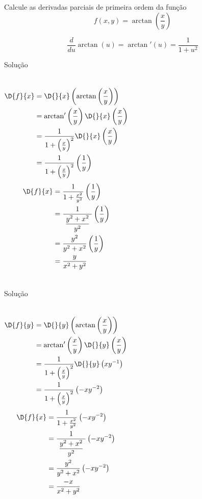 \begin{question}
  Calcule as derivadas parciais de primeira ordem da função
  \[
    f(x,y) = \arctan\left(\frac{x}{y}\right)
  \]

  \pause
  \[
    \frac{d}{du} \arctan(u) = \arctan'(u) = \frac{1}{1 + u^2}
  \]
\end{question}

\begin{resolution}{Solução}
\begin{columns}
  \begin{align*}
    \D{f}{x}
    & = \D{}{x}\left(\arctan\left(\frac{x}{y}\right)\right) \\
    & = \arctan'\left(\frac{x}{y}\right) \D{}{x}\left(\frac{x}{y}\right) \\
    & = \frac{1}{1+\left(\frac{x}{y}\right)^2} \D{}{x}\left(\frac{x}{y}\right) \\
    & = \frac{1}{1+\left(\frac{x}{y}\right)^2}\left(\frac{1}{y}\right) \\
  \end{align*}
\begin{align*}
  \D{f}{x}
  & = \frac{1}{1+\frac{x^2}{y^2}}\left(\frac{1}{y}\right) \\
  & = \frac{1}{\;\dfrac{y^2+x^2}{y^2}\;}\left(\frac{1}{y}\right) \\
  & = \frac{y^2}{y^2+x^2}\left(\frac{1}{y}\right) \\
  & = \frac{y}{x^2 + y^2}
\end{align*}
\end{columns}
\end{resolution}

\begin{resolution}{Solução}
  \begin{columns}
    \begin{align*}
      \D{f}{y}
      & = \D{}{y}\left(\arctan\left(\frac{x}{y}\right)\right) \\
      & = \arctan'\left(\frac{x}{y}\right) \D{}{y}\left(\frac{x}{y}\right) \\
      & = \frac{1}{1+\left(\frac{x}{y}\right)^2} \D{}{y}\left(xy^{-1}\right) \\
      & = \frac{1}{1+\left(\frac{x}{y}\right)^2} \left(-xy^{-2}\right) \\
    \end{align*}
    \begin{align*}
      \D{f}{x}
      & = \frac{1}{1+\frac{x^2}{y^2}}        \left(-xy^{-2}\right) \\
      & = \frac{1}{\;\dfrac{y^2+x^2}{y^2}\;} \left(-xy^{-2}\right) \\
      & = \frac{y^2}{y^2+x^2}                \left(-xy^{-2}\right) \\
      & = \frac{-x}{x^2 + y^2}
    \end{align*}
  \end{columns}
\end{resolution}

